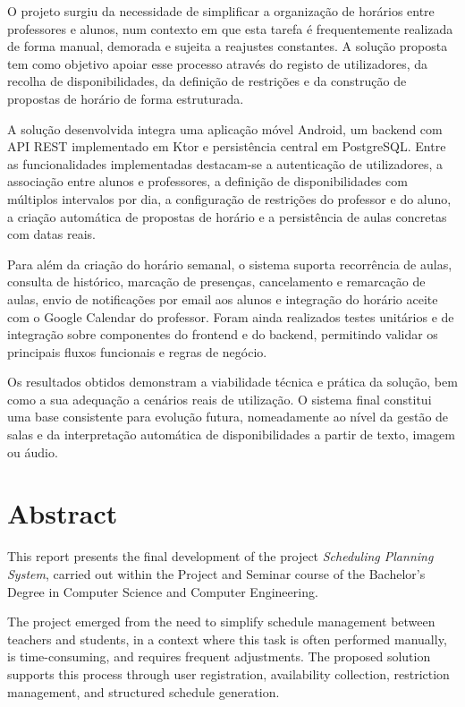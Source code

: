\documentclass[a4paper,openright,twoside,11pt]{report}
\begin{document}
    O projeto surgiu da necessidade de simplificar a organização de horários entre professores e alunos, num contexto em que esta tarefa é frequentemente realizada de forma manual, demorada e sujeita a reajustes constantes. A solução proposta tem como objetivo apoiar esse processo através do registo de utilizadores, da recolha de disponibilidades, da definição de restrições e da construção de propostas de horário de forma estruturada.

    A solução desenvolvida integra uma aplicação móvel Android, um backend com API REST implementado em Ktor e persistência central em PostgreSQL. Entre as funcionalidades implementadas destacam-se a autenticação de utilizadores, a associação entre alunos e professores, a definição de disponibilidades com múltiplos intervalos por dia, a configuração de restrições do professor e do aluno, a criação automática de propostas de horário e a persistência de aulas concretas com datas reais.

    Para além da criação do horário semanal, o sistema suporta recorrência de aulas, consulta de histórico, marcação de presenças, cancelamento e remarcação de aulas, envio de notificações por email aos alunos e integração do horário aceite com o Google Calendar do professor. Foram ainda realizados testes unitários e de integração sobre componentes do frontend e do backend, permitindo validar os principais fluxos funcionais e regras de negócio.

    Os resultados obtidos demonstram a viabilidade técnica e prática da solução, bem como a sua adequação a cenários reais de utilização. O sistema final constitui uma base consistente para evolução futura, nomeadamente ao nível da gestão de salas e da interpretação automática de disponibilidades a partir de texto, imagem ou áudio.


    \cleardoublepage
    \chapter*{Abstract}

    This report presents the final development of the project \textit{Scheduling Planning System}, carried out within the Project and Seminar course of the Bachelor's Degree in Computer Science and Computer Engineering.

    The project emerged from the need to simplify schedule management between teachers and students, in a context where this task is often performed manually, is time-consuming, and requires frequent adjustments. The proposed solution supports this process through user registration, availability collection, restriction management, and structured schedule generation.
\end{document}
